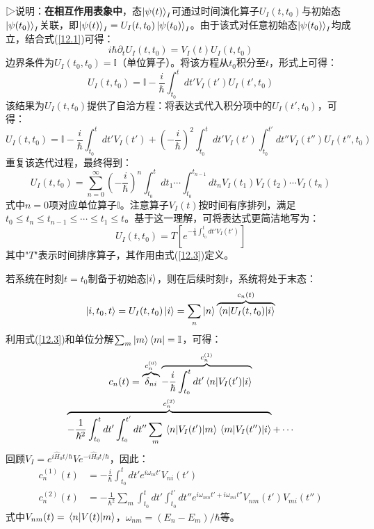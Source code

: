 ▷说明：\textbf{在相互作用表象中}，态$\ket{\psi(t)}_I$可通过时间演化算子$U_I(t,t_0)$与初始态$\ket{\psi(t_0)}_I$关联，即$\ket{\psi(t)}_I=U_I(t,t_0)\ket{\psi(t_0)}_I$。由于该式对任意初始态$\ket{\psi(t_0)}_I$均成立，结合式(\ref{12.1})可得：
\begin{equation}
	i\hbar\partial_t U_I(t,t_0)=V_I(t)U_I(t,t_0)
\end{equation}
边界条件为$U_I(t_0,t_0)=\mathbb{I}$（单位算子）。将该方程从$t_0$积分至$t$，形式上可得：
\begin{equation}
	U_I(t,t_0)=\mathbb{I}-\frac{i}{\hbar}\int_{t_0}^t dt' V_I(t')U_I(t',t_0)
\end{equation}
该结果为$U_I(t,t_0)$提供了自洽方程：将表达式代入积分项中的$U_I(t',t_0)$，可得：
\begin{equation}
	U_I(t,t_0)=\mathbb{I}-\frac{i}{\hbar}\int_{t_0}^t dt' V_I(t')+\left(-\frac{i}{\hbar}\right)^2\int_{t_0}^t dt' V_I(t')\int_{t_0}^{t'} dt'' V_I(t'')U_I(t'',t_0)
\end{equation}
重复该迭代过程，最终得到：
\begin{equation}\label{12.3}
	U_I(t,t_0)=\sum_{n=0}^\infty \left(-\frac{i}{\hbar}\right)^n \int_{t_0}^t dt_1\cdots\int_{t_0}^{t_{n-1}} dt_n V_I(t_1)V_I(t_2)\cdots V_I(t_n)
\end{equation}
式中$n=0$项对应单位算子$\mathbb{I}$。注意算子$V_I(t)$按时间有序排列，满足$t_0\leq t_n\leq t_{n-1}\leq\cdots\leq t_1\leq t$。基于这一理解，可将表达式更简洁地写为：
\begin{equation}
	U_I(t,t_0)=T\left[e^{-\frac{i}{\hbar}\int_{t_0}^t dt' V_I(t')}\right]
\end{equation}
其中"$T$"表示时间排序算子，其作用由式(\ref{12.3})定义。

若系统在时刻$t=t_0$制备于初始态$\ket{i}$，则在后续时刻$t$，系统将处于末态：
\begin{equation}
	\ket{i,t_0,t}=U_I(t,t_0)\ket{i}=\sum_n \ket{n} \overbrace{\matrixel{n}{U_I(t,t_0)}{i}}^{c_n(t)}
\end{equation}
利用式(\ref{12.3})和单位分解$\sum_m \ket{m}\bra{m}=\mathbb{I}$，可得：
\begin{multline}
	c_n(t) = \overbrace{\delta_{ni}}^{c_n^{(0)}} 
	\overbrace{-\frac{i}{\hbar}\int_{t_0}^t dt'\matrixel{n}{V_I(t')}{i}}^{c_n^{(1)}} \\
	\overbrace{-\frac{1}{\hbar^2}\int_{t_0}^t dt'\int_{t_0}^{t'} dt''\sum_m \matrixel{n}{V_I(t')}{m}\matrixel{m}{V_I(t'')}{i}}^{c_n^{(2)}}
	+\cdots
\end{multline}
回顾$V_I=e^{i\hat{H}_0 t/\hbar}Ve^{-i\hat{H}_0 t/\hbar}$，因此：
\begin{equation}\label{12.4}
	\boxed
	{
		\begin{aligned}
			c_n^{(1)}(t)&=-\frac{i}{\hbar}\int_{t_0}^t dt' e^{i\omega_{ni}t'} V_{ni}(t')\\
			c_n^{(2)}(t)&=-\frac{1}{\hbar^2}\sum_m \int_{t_0}^t dt'\int_{t_0}^{t'} dt'' e^{i\omega_{nm}t'+i\omega_{mi}t''} V_{nm}(t')V_{mi}(t'')
		\end{aligned}
	}
\end{equation}
式中$V_{nm}(t)=\matrixel{n}{V(t)}{m}$，$\omega_{nm}=(E_n-E_m)/\hbar$等。

